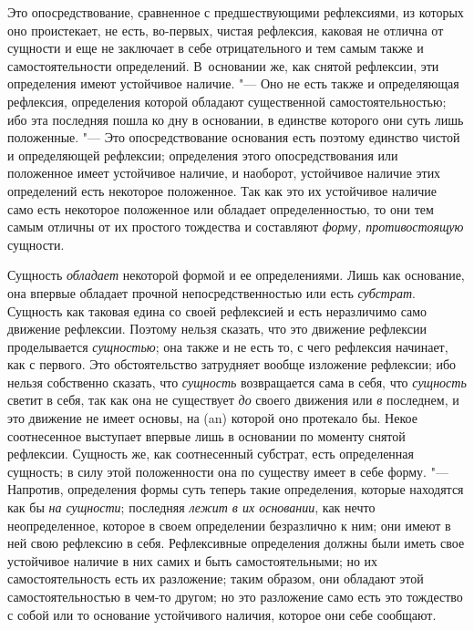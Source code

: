 Это опосредствование, сравненное с предшествующими рефлексиями, из которых
оно проистекает, не есть, во-первых, чистая рефлексия, каковая не отлична
от сущности и еще не заключает в себе отрицательного и тем самым также и
самостоятельности определений. В~основании же, как снятой рефлексии, эти
определения имеют устойчивое наличие. "--- Оно не есть также и определяющая
рефлексия, определения которой обладают существенной самостоятельностью;
ибо эта последняя пошла ко дну в основании, в единстве которого они суть
лишь положенные. "--- Это опосредствование основания есть поэтому единство
чистой и определяющей рефлексии; определения этого опосредствования или
положенное имеет устойчивое наличие, и наоборот, устойчивое наличие этих
определений есть некоторое положенное. Так как это их устойчивое наличие
само есть некоторое положенное или обладает определенностью, то они тем
самым отличны от их простого тождества и составляют
{\em форму, противостоящую} сущности.

Сущность {\em обладает} некоторой формой и ее
определениями. Лишь как основание, она впервые обладает прочной
непосредственностью или есть {\em субстрат}. Сущность
как таковая едина со своей рефлексией и есть неразличимо само движение
рефлексии. Поэтому нельзя сказать, что это движение рефлексии проделывается
{\em сущностью}; она также и не есть то, с чего
рефлексия начинает, как с первого. Это обстоятельство затрудняет вообще
изложение рефлексии; ибо нельзя собственно сказать, что
{\em сущность} возвращается сама в себя, что
{\em сущность} светит в себя, так как она не существует
{\em до} своего движения или
{\em в} последнем, и это движение не имеет основы, на
(an) которой оно протекало бы. Некое соотнесенное выступает впервые лишь в
основании по моменту снятой рефлексии. Сущность же, как соотнесенный
субстрат, есть определенная сущность; в силу этой положенности она по
существу имеет в себе форму. "--- Напротив, определения формы суть теперь
такие определения, которые находятся как бы {\em на
сущности}; последняя {\em лежит в их основании}, как
нечто неопределенное, которое в своем определении безразлично к ним; они
имеют в ней свою рефлексию в себя. Рефлексивные определения должны были
иметь свое устойчивое наличие в них самих и быть самостоятельными; но их
самостоятельность есть их разложение; таким образом, они обладают этой
самостоятельностью в чем-то другом; но это разложение само есть это
тождество с собой или то основание устойчивого наличия, которое они себе
сообщают.

